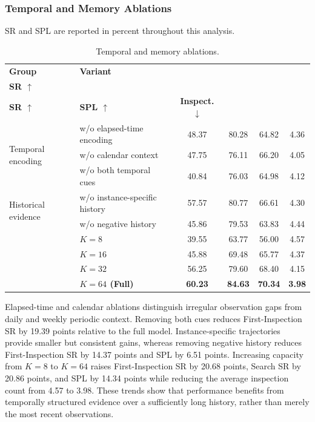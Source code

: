 \subsubsection{Temporal and Memory Ablations}

SR and SPL are reported in percent throughout this analysis.

\begin{table}[!htbp]
\caption{Temporal and memory ablations.}
\label{tab:temporal-memory-ablation}
\centering
\scriptsize
\setlength{\tabcolsep}{3.5pt}
\begin{tabularx}{0.88\linewidth}{@{}l>{\raggedright\arraybackslash}Xcccc@{}}
\toprule
\textbf{Group} & \textbf{Variant} &
\makecell{\textbf{First-Inspection}\\\textbf{SR $\uparrow$}} &
\makecell{\textbf{Search}\\\textbf{SR $\uparrow$}} & \textbf{SPL $\uparrow$} &
\textbf{Inspect. $\downarrow$}\\
\midrule
\multirow{3}{*}{Temporal encoding}
& w/o elapsed-time encoding & 48.37 & 80.28 & 64.82 & 4.36\\
& w/o calendar context & 47.75 & 76.11 & 66.20 & 4.05\\
& w/o both temporal cues & 40.84 & 76.03 & 64.98 & 4.12\\
\midrule
\multirow{2}{*}{Historical evidence}
& w/o instance-specific history & 57.57 & 80.77 & 66.61 & 4.30\\
& w/o negative history & 45.86 & 79.53 & 63.83 & 4.44\\
\midrule
& $K=8$ & 39.55 & 63.77 & 56.00 & 4.57\\
& $K=16$ & 45.88 & 69.48 & 65.77 & 4.37\\
& $K=32$ & 56.25 & 79.60 & 68.40 & 4.15\\
\rowcolor{tblours}\multirow{-4}{*}{History capacity} & \textbf{$K=64$ (Full)} & \textbf{60.23} &
\textbf{84.63} & \textbf{70.34} & \textbf{3.98}\\
\bottomrule
\end{tabularx}
\end{table}
\FloatBarrier

Elapsed-time and calendar ablations distinguish irregular observation gaps from
daily and weekly periodic context. Removing both cues reduces First-Inspection SR by
19.39 points relative to the full model. Instance-specific trajectories provide
smaller but consistent gains, whereas removing negative history reduces
First-Inspection SR by 14.37 points and SPL by 6.51 points. Increasing capacity from $K=8$ to $K=64$
raises First-Inspection SR by 20.68 points, Search SR by 20.86 points, and SPL by 14.34
points while reducing the average inspection count from 4.57 to 3.98. These
trends show that performance benefits from temporally structured evidence over a
sufficiently long history, rather than merely the most recent observations.

